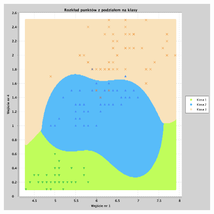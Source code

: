 \documentclass[a4paper, portrait,11pt]{article}
\begin{document}
\begin{figure}[!htb]
\begin{minipage}{0.33\textwidth}
    \caption{\label{fig:43_2_1,3derivative}}
  \end{minipage}
  \begin{minipage}{0.33\textwidth}
    \centering
    \includegraphics[width=1\linewidth]{../data/classification4/3/derivatives/2_1,4.png}
    \caption{\label{fig:43_2_1,4derivative}}
  \end{minipage}\hfill
\end{figure}
\end{document}
